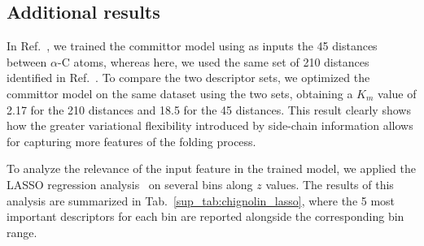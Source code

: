     \subsection{Additional results}
        In Ref.~, we trained the committor model using as inputs the 45 distances between $\alpha$-C atoms, whereas here, we used the same set of 210 distances identified in Ref.~.
        To compare the two descriptor sets, we optimized the committor model on the same dataset using the two sets, obtaining a $K_m$ value of 2.17 for the 210 distances and 18.5 for the 45 distances.
        This result clearly shows how the greater variational flexibility introduced by side-chain information allows for capturing more features of the folding process.

        To analyze the relevance of the input feature in the trained model, we applied the LASSO regression analysis~\cite{novelli2022lasso} on several bins along $z$ values. 
        The results of this analysis are summarized in Tab.~\ref{sup_tab:chignolin_lasso}, where the 5 most important descriptors for each bin are reported alongside the corresponding bin range.
        
